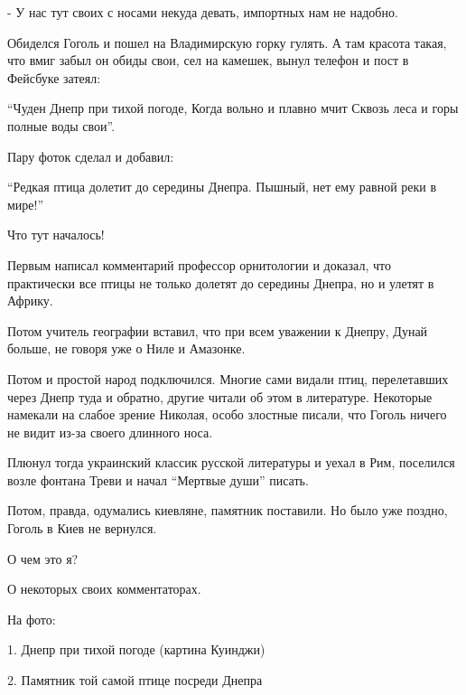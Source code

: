  - У нас тут своих с носами некуда девать, импортных нам не надобно.

Обиделся Гоголь и пошел на Владимирскую горку гулять. А там красота такая, что
вмиг забыл он обиды свои, сел на камешек, вынул телефон и пост в Фейсбуке
затеял:

\begin{zznagolos}
\enquote{Чуден Днепр при тихой погоде, 
Когда вольно и плавно мчит
Сквозь леса и горы полные воды свои}.
\end{zznagolos}

Пару фоток сделал и добавил:

\begin{zznagolos}
\enquote{Редкая птица долетит до середины Днепра.
Пышный, нет ему равной реки в мире!}
\end{zznagolos}

Что тут началось! 

Первым написал комментарий профессор орнитологии и доказал, что практически все
птицы не только долетят до середины Днепра, но и улетят в Африку.

Потом учитель географии вставил, что при всем уважении к Днепру, Дунай больше,
не говоря уже о Ниле и Амазонке.

Потом и простой народ подключился. Многие сами видали птиц, перелетавших через
Днепр туда и обратно, другие читали об этом в литературе. Некоторые намекали на
слабое зрение Николая, особо злостные писали, что Гоголь ничего не видит из-за
своего длинного носа.

Плюнул тогда украинский классик русской литературы и уехал в Рим, поселился
возле фонтана Треви и начал \enquote{Мертвые души} писать. 

Потом, правда, одумались киевляне, памятник поставили. Но было уже поздно,
Гоголь в Киев не вернулся.

О чем это я? 

О некоторых своих комментаторах.

На фото:

1. Днепр при тихой погоде (картина Куинджи)

2. Памятник той самой птице посреди Днепра
